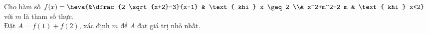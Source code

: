 \begin{bt}%
	Cho hàm số $f(x)= \heva{&\dfrac{2 \sqrt{x+2}-3}{x-1} & \text { khi } x \geq 2 \\& x^2+m^2-2 m & \text { khi } x<2}$ với $m$ là tham số thực.\\
	Đặt $A=f(1)+f(2)$, xác định $m$ để $A$ đạt giá trị nhỏ nhất.
\end{bt}

